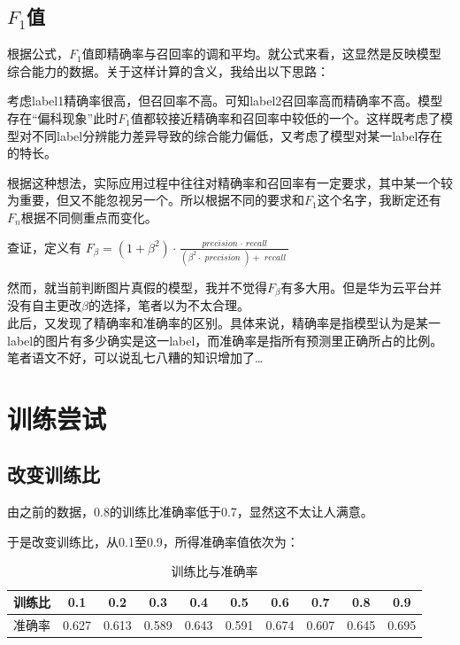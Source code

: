 \documentclass[boldfont,linespread=1.35]{ctexart}
\begin{document}
\subsection{$F_{1}$值}
根据公式，$F_{1}$值即精确率与召回率的调和平均。就公式来看，这显然是反映模型综合能力的数据。关于这样计算的含义，我给出以下思路：

考虑label1精确率很高，但召回率不高。可知label2召回率高而精确率不高。模型存在“偏科现象”此时$F_{1}$值都较接近精确率和召回率中较低的一个。这样既考虑了模型对不同label分辨能力差异导致的综合能力偏低，又考虑了模型对某一label存在的特长。

根据这种想法，实际应用过程中往往对精确率和召回率有一定要求，其中某一个较为重要，但又不能忽视另一个。所以根据不同的要求和$F_{1}$这个名字，我断定还有$F_{n}$根据不同侧重点而变化。

查证，定义有
$F_{\beta}=\left(1+\beta^{2}\right) \cdot \frac{\textit { precision } \cdot \textit { recall }}{\left(\beta^{2} \cdot \textit { precision }\right)+\textit { recall }}$

然而，就当前判断图片真假的模型，我并不觉得$F_{\beta}$有多大用。但是华为云平台并没有自主更改$\beta$的选择，笔者以为不太合理。\\

此后，又发现了精确率和准确率的区别。具体来说，精确率是指模型认为是某一label的图片有多少确实是这一label，而准确率是指所有预测里正确所占的比例。笔者语文不好，可以说乱七八糟的知识增加了\ldots

\section{训练尝试}
\subsection{改变训练比}
由之前的数据，0.8的训练比准确率低于0.7，显然这不太让人满意。

于是改变训练比，从0.1至0.9，所得准确率值依次为：

\begin{table} [h]
	\centering
	\caption{训练比与准确率}
	\begin{tabular}
		{cccccccccc}
		\toprule[1pt]
		\rowcolor[gray]{0.9} 训练比 &0.1 &0.2 &0.3 &0.4 &0.5 &0.6 &0.7 &0.8 &0.9\\
		\midrule
		准确率   &0.627 &0.613 &0.589 &0.643 &0.591 &0.674 &0.607 &0.645 &0.695\\
		\bottomrule[1pt]
	\end{tabular}
\end{table}
\end{document}
